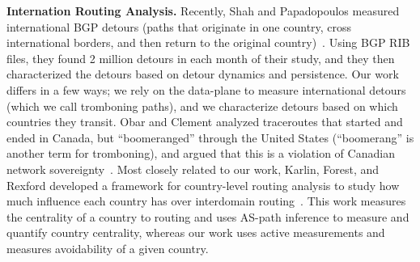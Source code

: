 {\bf Internation Routing Analysis.}  Recently, Shah and Papadopoulos measured international BGP detours (paths that originate in one country, cross international borders, and then return to the original country)~\cite{shah2015characterizing}.  Using BGP RIB files, they found 2 million detours in each month of their study, and they then characterized the detours based on detour dynamics and persistence.  Our work differs in a few ways; we rely on the data-plane to measure international detours (which we call tromboning paths), and we characterize detours based on which countries they transit.  Obar and Clement analyzed traceroutes that started and ended in Canada, but ``boomeranged'' through the United States (``boomerang'' is another term for tromboning), and argued that this is a violation of Canadian network sovereignty~\cite{obar2012internet}.  Most closely related to our work, Karlin, Forest, and Rexford developed a framework for country-level routing analysis to study how much influence each country has over interdomain routing~\cite{karlin2009nation}.  This work measures the centrality of a country to routing and uses AS-path inference to measure and quantify country centrality, whereas our work uses active measurements and measures avoidability of a given country.

